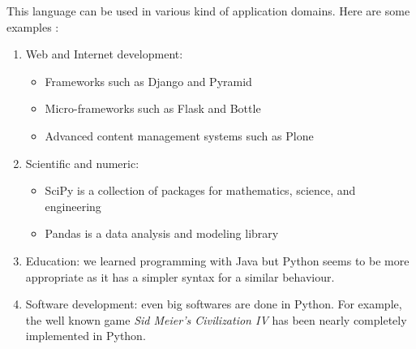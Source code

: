 This language can be used in various kind of application domains. Here are some examples \cite{python_applications}:
\begin{enumerate}
    \item{Web and Internet development:
        \begin{itemize}
            \item Frameworks such as Django and Pyramid
            \item Micro-frameworks such as Flask and Bottle
            \item Advanced content management systems such as Plone
        \end{itemize}
    }
    \item{Scientific and numeric:
        \begin{itemize}
            \item SciPy is a collection of packages for mathematics, science, and engineering
            \item Pandas is a data analysis and modeling library
        \end{itemize}
    
    }
    \item Education: we learned programming with Java but Python seems to be more appropriate as it has a simpler syntax for a similar behaviour.
    \item Software development: even big softwares are done in Python. For example, the well known game \emph{Sid Meier's Civilization IV} has been nearly completely implemented in Python.
\end{enumerate}

